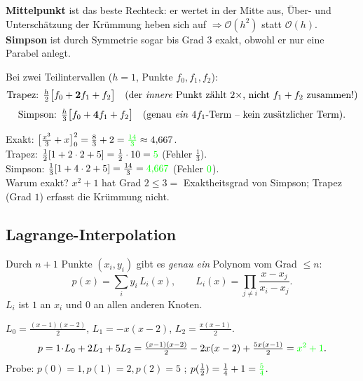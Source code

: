 \documentclass[a4paper,11pt]{article}
\newcommand{\f}[1]{\textcolor{green}{#1}}
\begin{document}
\begin{merke}
\textbf{Mittelpunkt} ist das beste Rechteck: er wertet in der Mitte aus, Über- und Unterschätzung der
Krümmung heben sich auf $\Rightarrow \mathcal O(h^2)$ statt $\mathcal O(h)$. \;
\textbf{Simpson} ist durch Symmetrie sogar bis Grad $3$ exakt, obwohl er nur eine Parabel anlegt.
\end{merke}

\begin{achtung}
Bei zwei Teilintervallen ($h=1$, Punkte $f_0,f_1,f_2$):
\[ \text{Trapez: } \tfrac h2\big[f_0+\mathbf{2}f_1+f_2\big]\quad\text{(der \emph{innere} Punkt zählt
$2\times$, nicht $f_1+f_2$ zusammen!)} \]
\[ \text{Simpson: } \tfrac h3\big[f_0+\mathbf{4}f_1+f_2\big]\quad\text{(genau \emph{ein} $4f_1$-Term --
kein zusätzlicher Term).} \]
\end{achtung}

\begin{beispiel}[$I=\int_0^2(x^2+1)\,dx$, $f(0)=1,f(1)=2,f(2)=5$]
Exakt: $\big[\tfrac{x^3}3+x\big]_0^2=\tfrac83+2=\f{\tfrac{14}{3}}\approx4{,}667$.\\
Trapez: $\tfrac12[1+2\cdot2+5]=\tfrac12\cdot10=\f{5}$ (Fehler $\tfrac13$).\\
Simpson: $\tfrac13[1+4\cdot2+5]=\tfrac{14}{3}=\f{4{,}667}$ (Fehler $\f{0}$).\\
Warum exakt? $x^2+1$ hat Grad $2\le3=$ Exaktheitsgrad von Simpson; Trapez (Grad $1$) erfasst die
Krümmung nicht.
\end{beispiel}

\subsection{Lagrange-Interpolation}
\begin{formel}
Durch $n{+}1$ Punkte $(x_i,y_i)$ gibt es \emph{genau ein} Polynom vom Grad $\le n$:
\[ p(x)=\sum_{i} y_i\,L_i(x),\qquad L_i(x)=\prod_{j\neq i}\frac{x-x_j}{x_i-x_j}. \]
$L_i$ ist $1$ an $x_i$ und $0$ an allen anderen Knoten.
\end{formel}

\begin{beispiel}[Punkte $(0,1),(1,2),(2,5)$]
$L_0=\tfrac{(x-1)(x-2)}{2}$, $L_1=-x(x-2)$, $L_2=\tfrac{x(x-1)}{2}$.
\[ p=1\!\cdot\!L_0+2L_1+5L_2=\tfrac{(x-1)(x-2)}2-2x(x-2)+\tfrac{5x(x-1)}2=\f{x^2+1}. \]
Probe: $p(0)=1,p(1)=2,p(2)=5$ \checkmark; \; $p(\tfrac12)=\tfrac14+1=\f{\tfrac54}$.
\end{beispiel}
\end{document}
